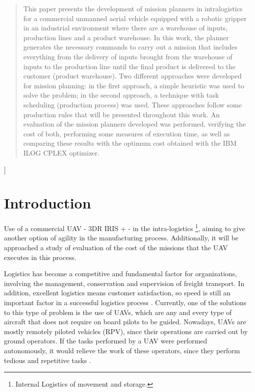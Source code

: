 \documentclass[conference,harvard,brazil,english]{sbatex}
\begin{document}
\begin{abstract}
 This paper presents the development of mission planners in intralogistics for a commercial unmanned aerial vehicle equipped with a robotic gripper in an industrial environment where there are a warehouse of inputs, production lines and a product warehouse. In this work, the planner generates the necessary commands to carry out a mission that includes everything from the delivery of inputs brought from the warehouse of inputs to the production line until the final product is delivered to the customer (product warehouse). Two different approaches were developed for mission planning: in the first approach, a simple heuristic was used to solve the problem; in the second approach, a technique with task scheduling (production process) was used. These approaches follow some production rules that will be presented throughout this work. An evaluation of the mission planners developed was performed, verifying the cost of both, performing some measures of execution time, as well as comparing these results with the optimum cost obtained with the IBM ILOG CPLEX optimizer.
\end{abstract}

]


\section{Introduction}
\label{sec:introduction}

Use of a commercial UAV - 3DR IRIS + - in the intra-logistics \footnote{Internal Logistics of movement and storage.}, aiming to give another option of agility in the manufacturing process. Additionally, it will be approached a study of evaluation of the cost of the missions that the UAV executes in this process.

Logistics has become a competitive and fundamental factor for organizations, involving the management, conservation and supervision of freight transport. In addition, excellent logistics means customer satisfaction, so speed is still an important factor in a successful logistics process \cite{drone4logistic}. Currently, one of the solutions to this type of problem is the use of UAVs, which are any and every type of aircraft that does not require on board pilots to be guided. Nowadays, UAVs are mostly remotely piloted vehicles (RPV), since their operations are carried out by ground operators. If the tasks performed by a UAV were performed autonomously, it would relieve the work of these operators, since they perform tedious and repetitive tasks \cite{pascarella2013autonomic}.
\end{document}
